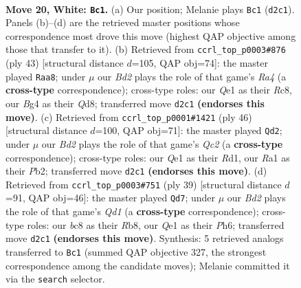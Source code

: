 \documentclass[11pt]{article}
\begin{document}
\clearpage

\begin{figure}[p]\centering
\begin{subfigure}{0.46\textwidth}\centering
\resizebox{\linewidth}{!}{%
\newchessgame
\chessboard[
  setfen={r1b3k1/pppp1pp1/1b1n1q1p/3P4/6B1/2N4P/PPPB1PP1/R3Q1K1 w - - 2 20},
  showmover=false,
  pgfstyle=straightmove, color=movearrow, markmove={d2-c1}
]}
\caption{}
\end{subfigure}\hfill
\begin{subfigure}{0.46\textwidth}\centering
\resizebox{\linewidth}{!}{%
\newchessgame
\chessboard[
  setfen={2rq2k1/4bpp1/1np1pn1p/rp6/3P4/2N1PQ1P/P1RB1PP1/1R3BK1 b - - 3 22},
  showmover=false,
  pgfstyle=straightmove, color=movearrow, markmove={a5-a8}
]}
\caption{}
\end{subfigure}
\\[4pt]
\begin{subfigure}{0.46\textwidth}\centering
\resizebox{\linewidth}{!}{%
\newchessgame
\chessboard[
  setfen={3r2k1/1p3pb1/p1b1qnp1/3p3p/3P4/P1N1BB1P/1PQ2PP1/3R2K1 w - - 4 24},
  showmover=false,
  pgfstyle=straightmove, color=movearrow, markmove={c2-d2}
]}
\caption{}
\end{subfigure}\hfill
\begin{subfigure}{0.46\textwidth}\centering
\resizebox{\linewidth}{!}{%
\newchessgame
\chessboard[
  setfen={1r1qn1k1/2p2pp1/1p1b3p/p2P1b2/Q2B4/6P1/PP3PBP/R2N2K1 b - - 1 20},
  showmover=false,
  pgfstyle=straightmove, color=movearrow, markmove={d8-d7}
]}
\caption{}
\end{subfigure}
\caption{\textbf{Move 20, White: \texttt{Bc1}.} (a) Our position; Melanie plays \texttt{Bc1} (\texttt{d2c1}). Panels (b)--(d) are the retrieved master positions whose correspondence most drove this move (highest QAP objective among those that transfer to it). (b) Retrieved from \texttt{ccrl\_top\_p0003\#876} (ply 43) [structural distance $d$=105, QAP obj=74]: the master played \texttt{Raa8}; under $\mu$ our \emph{Bd2} plays the role of that game's \emph{Ra4} (a \textbf{cross-type} correspondence); cross-type roles: our \emph{Q}e1 as their \emph{R}c8, our \emph{B}g4 as their \emph{Q}d8; transferred move \texttt{d2c1} \textbf{(endorses this move)}. (c) Retrieved from \texttt{ccrl\_top\_p0001\#1421} (ply 46) [structural distance $d$=100, QAP obj=71]: the master played \texttt{Qd2}; under $\mu$ our \emph{Bd2} plays the role of that game's \emph{Qc2} (a \textbf{cross-type} correspondence); cross-type roles: our \emph{Q}e1 as their \emph{R}d1, our \emph{R}a1 as their \emph{P}b2; transferred move \texttt{d2c1} \textbf{(endorses this move)}. (d) Retrieved from \texttt{ccrl\_top\_p0003\#751} (ply 39) [structural distance $d$=91, QAP obj=46]: the master played \texttt{Qd7}; under $\mu$ our \emph{Bd2} plays the role of that game's \emph{Qd1} (a \textbf{cross-type} correspondence); cross-type roles: our \emph{b}c8 as their \emph{R}b8, our \emph{Q}e1 as their \emph{P}h6; transferred move \texttt{d2c1} \textbf{(endorses this move)}. Synthesis: 5 retrieved analogs transferred to \texttt{Bc1} (summed QAP objective 327, the strongest correspondence among the candidate moves); Melanie committed it via the \texttt{search} selector.}
\label{fig:thought-m38}
\end{figure}
\end{document}
